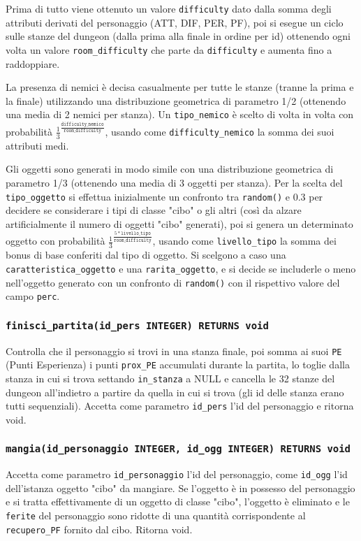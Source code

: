 \documentclass[10pt,a4paper]{article}
\begin{document}
Prima di tutto viene ottenuto un valore \texttt{difficulty} dato dalla somma degli attributi derivati del personaggio (ATT, DIF, PER, PF), poi si esegue un ciclo sulle stanze del dungeon (dalla prima alla finale in ordine per id) ottenendo ogni volta un valore \texttt{room\_difficulty} che parte da \texttt{difficulty} e aumenta fino a raddoppiare.

La presenza di nemici è decisa casualmente per tutte le stanze (tranne la prima e la finale) utilizzando una distribuzione geometrica di parametro 1/2 (ottenendo una media di 2 nemici per stanza). Un \texttt{tipo\_nemico} è scelto di volta in volta con probabilità $\frac{1}{3}^{\frac{\texttt{difficulty\_nemico}}{\texttt{room\_difficulty}}}$, usando come \texttt{difficulty\_nemico} la somma dei suoi attributi medi.

Gli oggetti sono generati in modo simile con una distribuzione geometrica di parametro 1/3 (ottenendo una media di 3 oggetti per stanza). Per la scelta del \texttt{tipo\_oggetto} si effettua inizialmente un confronto tra \texttt{random()} e 0.3 per decidere se considerare i tipi di classe "cibo" o gli altri (così da alzare artificialmente il numero di oggetti "cibo" generati), poi si genera un determinato oggetto con probabilità $\frac{1}{3}^{\frac{5*\texttt{livello\_tipo}}{\texttt{room\_difficulty}}}$, usando come \texttt{livello\_tipo} la somma dei bonus di base conferiti dal tipo di oggetto. Si scelgono a caso una \texttt{caratteristica\_oggetto} e una \texttt{rarita\_oggetto}, e si decide se includerle o meno nell'oggetto generato con un confronto di \texttt{random()} con il rispettivo valore del campo \texttt{perc}.

\subsubsection{\texttt{finisci\_partita(id\_pers INTEGER) RETURNS void}}
Controlla che il personaggio si trovi in una stanza finale, poi somma ai suoi \texttt{PE} (Punti Esperienza) i punti \texttt{prox\_PE} accumulati durante la partita, lo toglie dalla stanza in cui si trova settando \texttt{in\_stanza} a NULL e cancella le 32 stanze del dungeon all'indietro a partire da quella in cui si trova (gli id delle stanza erano tutti sequenziali). Accetta come parametro \texttt{id\_pers} l'id del personaggio e ritorna void.

\subsubsection{\texttt{mangia(id\_personaggio INTEGER, id\_ogg INTEGER) RETURNS void}}
Accetta come parametro \texttt{id\_personaggio} l'id del personaggio, come \texttt{id\_ogg} l'id dell'istanza oggetto "cibo" da mangiare. Se l'oggetto è in possesso del personaggio e si tratta effettivamente di un oggetto di classe "cibo", l'oggetto è eliminato e le \texttt{ferite} del personaggio sono ridotte di una quantità corrispondente al \texttt{recupero\_PF} fornito dal cibo. Ritorna void.
\end{document}
